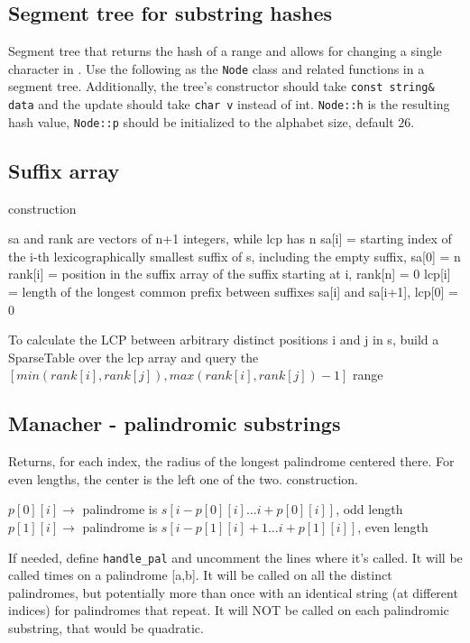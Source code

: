\subsection{Segment tree for substring hashes}

Segment tree that returns the hash of a range and allows for changing a single character in . Use the following as the \verb|Node| class and related functions in a segment tree. Additionally, the tree's constructor should take \verb|const string& data| and the update should take \verb|char v| instead of int. \verb|Node::h| is the resulting hash value, \verb|Node::p| should be initialized to the alphabet size, default $26$.



\subsection{Suffix array}
 construction

sa and rank are vectors of n+1 integers, while lcp has n
sa[i] = starting index of the i-th lexicographically
  smallest suffix of s, including the empty suffix, sa[0] = n
rank[i] = position in the suffix array of the suffix starting at i, rank[n] = 0
lcp[i] = length of the longest common prefix between
  suffixes sa[i] and sa[i+1], lcp[0] = 0

To calculate the LCP between arbitrary distinct positions i and j in s, build a SparseTable over the lcp array and query the $[min(rank[i],rank[j]),max(rank[i],rank[j])-1]$ range


\subsection{Manacher - palindromic substrings}
Returns, for each index, the radius of the longest palindrome centered there. For even lengths, the center is the left one of the two.  construction.

\begin{flushleft}
$p[0][i] \xrightarrow{}$ palindrome is $s[i-p[0][i] \ldots i+p[0][i]]$, odd length \\
$p[1][i] \xrightarrow{}$ palindrome is $s[i-p[1][i]+1 \ldots i+p[1][i]]$, even length
\end{flushleft}

If needed, define \texttt{handle\_pal} and uncomment the lines where it's called. It will be called  times on a palindrome [a,b]. It will be called on all the distinct palindromes, but potentially more than once with an identical string (at different indices) for palindromes that repeat. It will NOT be called on each palindromic substring, that would be quadratic.


